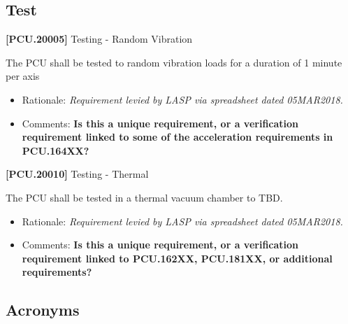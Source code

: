 \section{Test}
\label{test}

\textbf{[PCU.20005]} Testing - Random Vibration

The \gls{PCU} shall be tested to random vibration loads for a duration of 1 minute per axis

\begin{itemize}
\item{} Rationale: \emph{Requirement levied by LASP via spreadsheet dated 05MAR2018.}

\item{} Comments: \textbf{Is this a unique requirement, or a verification requirement linked to some of the acceleration requirements in PCU.164XX?}

\end{itemize}

\textbf{[PCU.20010]} Testing - Thermal

The \gls{PCU} shall be tested in a thermal vacuum chamber to TBD\label{tbx_15}.

\begin{itemize}
\item{} Rationale: \emph{Requirement levied by LASP via spreadsheet dated 05MAR2018.}

\item{} Comments: \textbf{Is this a unique requirement, or a verification requirement linked to PCU.162XX, PCU.181XX, or additional requirements?}

\end{itemize}


\begin{appendices}


\chapter{Acronyms  }
\label{sec_acros}

\printglossary[type=\acronymtype]

\end{appendices}




